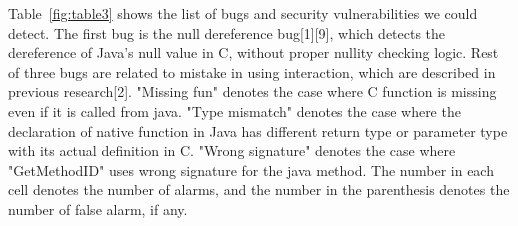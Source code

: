 Table~\ref{fig:table3} shows the list of bugs and security vulnerabilities we could detect.
The first bug is the null dereference bug[1][9], which detects the dereference of
Java's null value in C, without proper nullity checking logic. Rest of three
bugs are related to mistake in using interaction, which are described in
previous research[2]. "Missing fun" denotes the case where C function is
missing even if it is called from java. "Type mismatch" denotes the case where
the declaration of native function in Java has different return type or
parameter type with its actual definition in C.  "Wrong signature" denotes the
case where "GetMethodID" uses wrong signature for the java method. The
number in each cell denotes the number of alarms, and the number in the
parenthesis denotes the number of false alarm, if any.

